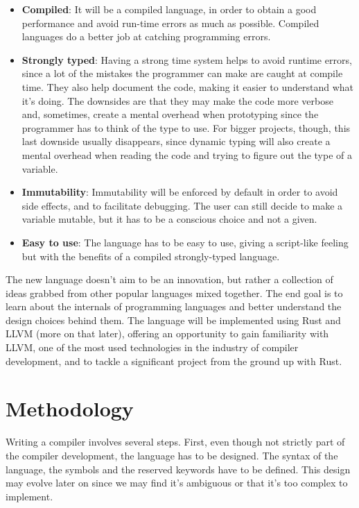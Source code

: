 ﻿\documentclass[10pt,a4paper,twocolumn,twoside]{article}
\begin{document}
\begin{itemize}
     \item \textbf{Compiled}: It will be a compiled language, in order to obtain
         a good performance and avoid run-time errors as much as possible.
         Compiled languages do a better job at catching programming errors.
     \item \textbf{Strongly typed}: Having a strong time system helps to avoid
         runtime errors, since a lot of the mistakes the programmer can make are
         caught at compile time. They also help document the code, making it
         easier to understand what it's doing. The downsides are that they may
         make the code more verbose and, sometimes, create a mental overhead
         when prototyping since the programmer has to think of the type to use.
         For bigger projects, though, this last downside usually disappears,
         since dynamic typing will also create a mental overhead when reading
         the code and trying to figure out the type of a variable.
     \item \textbf{Immutability}: Immutability will be enforced by default in 
         order to avoid side effects, and to facilitate debugging. The user can
         still decide to make a variable mutable, but it has to be a conscious
         choice and not a given.
    \item \textbf{Easy to use}: The language has to be easy to use, giving a 
        script-like feeling but with the benefits of a compiled strongly-typed
        language.
\end{itemize}

The new language doesn't aim to be an innovation, but rather a collection of
ideas grabbed from other popular languages mixed together. The end goal is to
learn about the internals of programming languages and better understand the
design choices behind them. The language will be implemented using Rust and LLVM
(more on that later), offering an opportunity to gain familiarity with LLVM, one
of the most used technologies in the industry of compiler development, and to
tackle a significant project from the ground up with Rust.

\section{Methodology}
Writing a compiler involves several steps. First, even though not strictly part
of the compiler development, the language has to be designed. The syntax of the
language, the symbols and the reserved keywords have to be defined. This design
may evolve later on since we may find it's ambiguous or that it's too complex to
implement.
\end{document}
